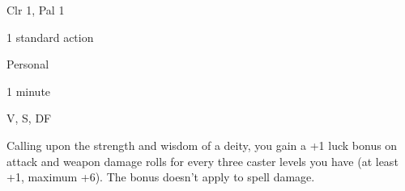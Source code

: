 
\begin{description*}
\item[Level:] Clr 1, Pal 1
\item[Casting Time:] 1 standard action
\item[Range:] Personal
\item[Duration:] 1 minute
\item[Components:] V, S, DF
\end{description*}

Calling upon the strength and wisdom of a deity, you gain a +1 luck bonus on attack
and weapon damage rolls for every three caster levels you have (at least +1, maximum
+6). The bonus doesn't apply to spell damage.
